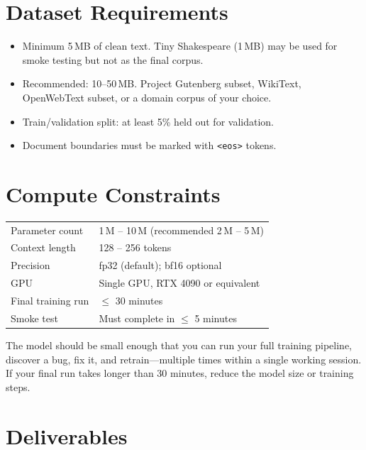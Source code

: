 \section*{Dataset Requirements}

\begin{itemize}[nosep]
  \item Minimum 5\,MB of clean text. Tiny Shakespeare (1\,MB) may be used for smoke testing but not as the final corpus.
  \item Recommended: 10--50\,MB. Project Gutenberg subset, WikiText, OpenWebText subset, or a domain corpus of your choice.
  \item Train/validation split: at least 5\% held out for validation.
  \item Document boundaries must be marked with \texttt{<eos>} tokens.
\end{itemize}


\section*{Compute Constraints}

\begin{center}
\begin{tabular}{ll}
\toprule
Parameter count & 1\,M -- 10\,M (recommended 2\,M -- 5\,M) \\
Context length & 128 -- 256 tokens \\
Precision & fp32 (default); bf16 optional \\
GPU & Single GPU, RTX 4090 or equivalent \\
Final training run & $\leq$ 30 minutes \\
Smoke test & Must complete in $\leq$ 5 minutes \\
\bottomrule
\end{tabular}
\end{center}

\noindent The model should be small enough that you can run your full training pipeline, discover a bug, fix it, and retrain---multiple times within a single working session. If your final run takes longer than 30 minutes, reduce the model size or training steps.


\section*{Deliverables}

